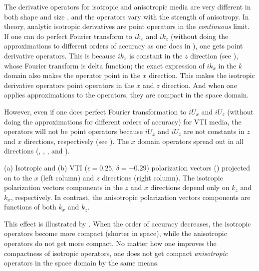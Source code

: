 The derivative operators for isotropic and anisotropic media are very
different in both shape and size {, and the operators vary with
the strength of anisotropy}. In theory, analytic isotropic derivatives
are point operators {in the \emph{continuous} limit}. If one can do
perfect Fourier transform to $ik_x$ and $ik_z$ (without doing the
approximations to different orders of accuracy as one does
in ), one gets point derivative operators. This is because
$ik_x$ is constant in the $z$ direction (see ), whose
Fourier transform is delta function; the exact expression of $ik_x$
in the $k$ domain also makes the operator point in the $x$
direction. This makes the isotropic derivative operators point
operators in the $x$ and $z$ direction. And when one applies
approximations to the operators, they are compact in the space domain.

However, even if one does perfect Fourier transformation to $iU_x$ and
$iU_z$ (without doing the approximations for different orders of
accuracy) for VTI media, the operators will not be point operators
because $iU_x$ and $iU_z$ are not constants in $z$ and $x$ directions,
respectively (see ). The $x$ domain operators spread out in
all directions (, , ,
and ).

  {(a)
  Isotropic and (b) VTI ($\epsilon=0.25$, $\delta=-0.29$) polarization
  vectors () projected on to the $x$ (left
  column) and $z$ directions (right column). {The isotropic
  polarization vectors components in the $z$ and $x$ directions depend
  only on $k_z$ and $k_x$, respectively. In contrast, the anisotropic
  polarization vectors components are functions of both $k_x$ and
  $k_z$.}}

This effect is illustrated by
. When the order of
accuracy decreases, the isotropic operators become more compact
(shorter in space), while the anisotropic operators do not get more
compact. No matter how one improves the compactness of isotropic
operators, one does not get compact {\it anisotropic} operators in the
space domain by the same means.



